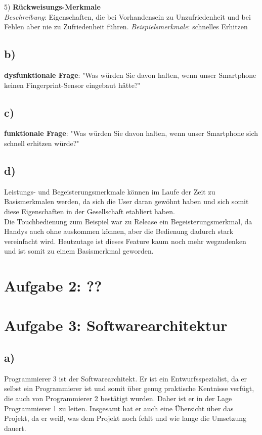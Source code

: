 \documentclass[12pt,pdftex,a4paper]{article}
\begin{document}
5) \textbf{Rückweisungs-Merkmale}\\
\textit{Beschreibung}: Eigenschaften, die bei Vorhandensein zu Unzufriedenheit und bei Fehlen aber nie zu Zufriedenheit führen.\newline
\textit{Beispielsmerkmale}: schnelles Erhitzen\\



\subsection*{b)}
\textbf{dysfunktionale Frage}: "Was würden Sie davon halten, wenn unser Smartphone keinen Fingerprint-Sensor eingebaut hätte?"
\subsection*{c)}
\textbf{funktionale Frage}: "Was würden Sie davon halten, wenn unser Smartphone sich schnell erhitzen würde?"
\subsection*{d)}
Leistungs- und Begeisterungsmerkmale können im Laufe der Zeit zu Basismerkmalen werden, da sich die User daran gewöhnt haben und sich somit diese Eigenschaften in der Gesellschaft etabliert haben.\\
Die Touchbedienung zum Beispiel war zu Release ein Begeisterungsmerkmal, da Handys auch ohne auskommen können, aber die Bedienung dadurch stark vereinfacht wird. Heutzutage ist dieses Feature kaum noch mehr wegzudenken und ist somit zu einem Basismerkmal geworden. 
\section*{Aufgabe 2: ??}
\section*{Aufgabe 3: Softwarearchitektur}
\subsection*{a)} 
Programmierer 3 ist der Softwarearchitekt. Er ist ein Entwurfsspezialist, da er selbst ein Programmierer ist und somit über genug praktische Kentnisse verfügt, die auch von Programmierer 2 bestätigt wurden. Daher ist er in der Lage Programmierer 1 zu leiten. Insgesamt hat er auch eine Übersicht über das Projekt, da er weiß, was dem Projekt noch fehlt und wie lange die Umsetzung dauert.
\end{document}
